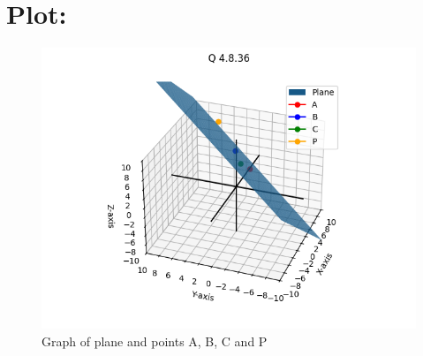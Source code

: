 \documentclass[a4paper, 12pt]{article}
\begin{document}
\section{Plot: }
\begin{figure}[h!]
    \centering
    \includegraphics[width=\columnwidth]{figs/plot.png}
    \caption{Graph of plane and points A, B, C and P}
    \label{fig:4.2.3}
\end{figure}
\end{document}
